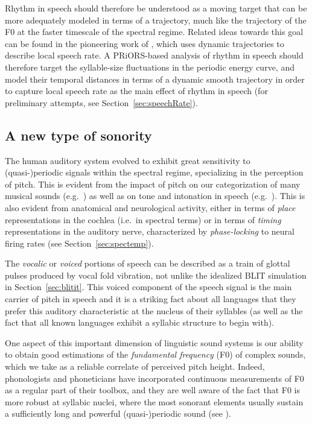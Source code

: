 Rhythm in speech should therefore be understood as a moving target that can be more adequately modeled in terms of a trajectory, much like the trajectory of the F0 at the faster timescale of the spectral regime.
Related ideas towards this goal can be found in the
pioneering work of \citet{pfitzinger2001phonetischesk}, which uses dynamic trajectories to describe local speech rate. A PRiORS-based analysis of rhythm in speech should therefore target the syllable-size fluctuations in the periodic energy curve, and model their temporal distances in terms of a dynamic smooth trajectory in order to capture local speech rate as the main effect of rhythm in speech (for preliminary attempts, see Section~\ref{sec:speechRate}).

\subsection{A new type of sonority}\label{sec:shiftSonority}

The human auditory system evolved to exhibit great sensitivity to (quasi-)pe\-ri\-od\-ic signals within the spectral regime, specializing in the perception of pitch. This is evident from the impact of pitch on our categorization of many musical sounds (e.g.~\citealt{bidelman2009neural}) as well as on tone and intonation in speech (e.g.~\citealt{krishnan2005encoding}).
This is also evident from anatomical and neurological activity, either in terms of \emph{place} representations in the cochlea (i.e.~in spectral terms) or in terms of \emph{timing} representations in the auditory nerve, characterized by \emph{phase-locking} to neural firing rates (see Section~\ref{sec:spectemp}).

The \emph{vocalic} or \emph{voiced} portions of speech can be described as a train of glottal pulses produced by vocal fold vibration, not unlike the idealized BLIT simulation in Section~\ref{sec:blitit}. This voiced component of the speech signal is the main carrier of pitch in speech and it is a striking fact about all languages that they prefer this auditory characteristic at the nucleus of their syllables (as well as the fact that all known languages exhibit a syllabic structure to begin with).

One aspect of this important dimension of linguistic sound systems is our ability to obtain good estimations of the \emph{fundamental frequency} (F0) of complex sounds, which we take as a reliable correlate of perceived pitch height. Indeed, phonologists and phoneticians have incorporated continuous measurements of F0 as a regular part of their toolbox, and they are well aware of the fact that F0 is more robust at syllabic nuclei, where the most sonorant elements usually sustain a sufficiently long and powerful (quasi-)periodic sound (see \citealt{barnes2011voicelesssk, barnes2014segmentalsk, roettger2019tune}).

